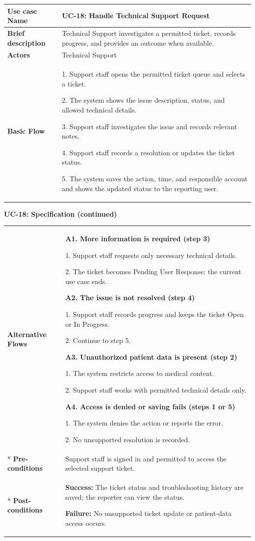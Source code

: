 \begin{longtable}{|p{}|p{}|}
\hline
\textbf{Use case Name} & UC-18: Handle Technical Support Request \\ \hline
\textbf{Brief description} & Technical Support investigates a permitted ticket, records progress, and provides an outcome when available. \\ \hline
\textbf{Actors} & Technical Support \\ \hline
\textbf{Basic Flow} &
1. Support staff opens the permitted ticket queue and selects a ticket.\par
2. The system shows the issue description, status, and allowed technical details.\par
3. Support staff investigates the issue and records relevant notes.\par
4. Support staff records a resolution or updates the ticket status.\par
5. The system saves the action, time, and responsible account and shows the updated status to the reporting user.
\\ \hline
\end{longtable}
\clearpage
\noindent\textbf{UC-18: Specification (continued)}
\begin{longtable}{|p{}|p{}|}
\hline
\textbf{Alternative Flows} &
\textbf{A1. More information is required (step 3)}\par
1. Support staff requests only necessary technical details.\par
2. The ticket becomes Pending User Response; the current use case ends.
\par
\textbf{A2. The issue is not resolved (step 4)}\par
1. Support staff records progress and keeps the ticket Open or In Progress.\par
2. Continue to step 5.
\par
\textbf{A3. Unauthorized patient data is present (step 2)}\par
1. The system restricts access to medical content.\par
2. Support staff works with permitted technical details only.
\par
\textbf{A4. Access is denied or saving fails (steps 1 or 5)}\par
1. The system denies the action or reports the error.\par
2. No unsupported resolution is recorded.
\\* \hline
\textbf{Pre-conditions} & Support staff is signed in and permitted to access the selected support ticket. \\* \hline
\textbf{Post-conditions} & \textbf{Success:} The ticket status and troubleshooting history are saved; the reporter can view the status.\par
\textbf{Failure:} No unsupported ticket update or patient-data access occurs. \\ \hline
\end{longtable}
